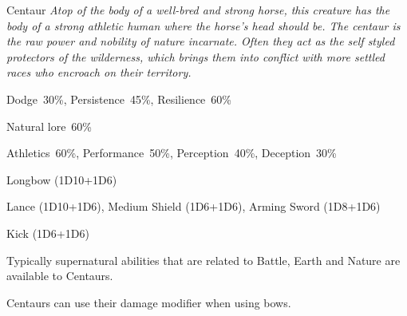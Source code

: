 \begin{monsterbox}{Centaur}
	\textit{Atop of the body of a well-bred and strong horse, this creature has the body of a strong athletic human where the horse’s head should be. The centaur is the raw power and nobility of nature incarnate. Often they act as the self styled protectors of the wilderness, which brings them into conflict with more settled races who encroach on their territory.}\\
	\rpghline
	\basics[%
        hitpoints  = 19, %
	majorwound = 10,
	damagemodifier = +1D6,
	powerpoints = 11,
	movementrate = 23m,
	armor = Leather (2AP),
	plunderrating = 2
	]
	\rpghline%
	\stats[ %
		STR = 3D6+6 (17),
		CON = 3D6   (11),
		DEX = 3D6+3 (14),
		SIZ = 4D6+12 (26),
		INT = 2D6+6 (13),
		POW = 3D6   (11),
		CHA = 3D6   (11)
	]
	\rpghline%
	\begin{rpg-monsteraction}[Resistances]
		Dodge~30\%, Persistence~45\%, Resilience~60\%
	\end{rpg-monsteraction}
	\begin{rpg-monsteraction}[Knowledge]
    		Natural lore~60\%
	\end{rpg-monsteraction}
	\begin{rpg-monsteraction}[Practical]
		Athletics~60\%, Performance~50\%, Perception~40\%, Deception~30\%
	\end{rpg-monsteraction}
	\begin{rpg-monsteraction}
		Longbow (1D10+1D6)
	\end{rpg-monsteraction}
	\begin{rpg-monsteraction}
		Lance (1D10+1D6), Medium Shield (1D6+1D6), Arming Sword (1D8+1D6)
	\end{rpg-monsteraction}
	\begin{rpg-monsteraction}
		Kick (1D6+1D6)
	\end{rpg-monsteraction}
	\begin{rpg-monsteraction}[Supernatural]
		Typically supernatural abilities that are related to Battle, Earth and Nature are available to Centaurs.
	\end{rpg-monsteraction}
	\begin{rpg-monsteraction}
		Centaurs can use their damage modifier when using bows.
	\end{rpg-monsteraction}

\end{monsterbox}

